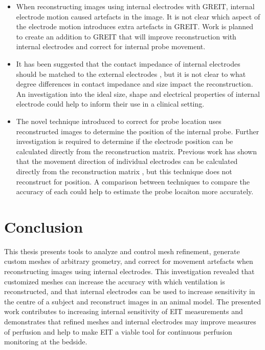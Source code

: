\begin{itemize}
	\item When reconstructing images using internal electrodes with GREIT, 
	internal electrode motion 
	caused artefacts in the image. 
	It is not clear which aspect of the electrode motion introduces extra artefacts in GREIT.
	Work is planned to create an addition to 
	GREIT that will improve reconstruction 
	with internal electrodes and correct for internal probe movement. 

	\item It has been suggested that the contact impedance of internal 
	electrodes should be matched to the
	external electrodes \parencite{nasehi_tehrani_evaluation_2012}, 
	but it is not clear to what degree
	differences in contact impedance and size impact the reconstruction. 
	An investigation into the ideal size, shape and 
	electrical properties of internal electrode 
	could help to inform their use in a clinical setting. 

	\item The novel technique introduced to correct for probe location uses reconstructed images 
	to determine the position of the internal probe. Further investigation is required to determine 
	if the electrode position can be calculated directly from the reconstruction matrix. Previous
	work has shown that 
	the movement direction of individual electrodes can be 
	calculated directly from the reconstruction matrix 
	\parencite{soleimani_imaging_2006}, but this technique does not reconstruct for position. 
	A comparison between techniques to compare the accuracy of each could help to 
	estimate the probe locaiton more accurately.
\end{itemize}

\section{Conclusion}
This thesis presents tools to analyze and control mesh refinement, generate custom meshes 
of arbitrary geometry, and correct for movement artefacts when reconstructing images using 
internal electrodes. This investigation revealed that customized meshes can increase
the accuracy with which ventilation is reconstructed, and that internal electrodes can be used to increase sensitivity 
in the centre of a subject and reconstruct images in an animal model.  
The presented work contributes to increasing internal sensitivity of 
EIT measurements and demonstrates that refined meshes and internal 
electrodes may improve measures of perfusion and help to make EIT a 
viable tool for continuous perfusion monitoring at the bedside.


